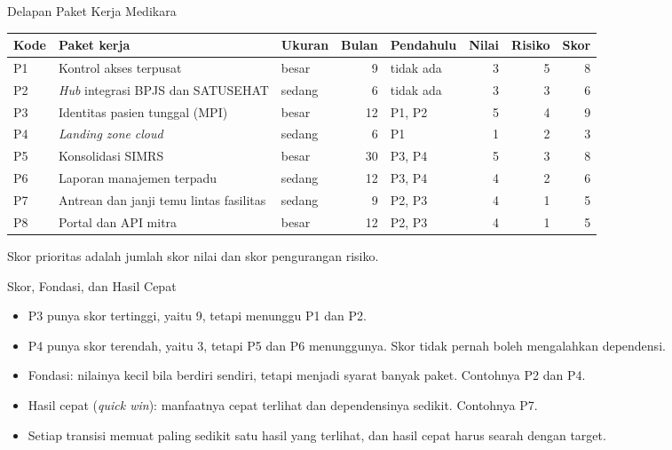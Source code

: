 \documentclass[aspectratio=169, table, 12pt]{beamer}
\begin{document}
\begin{frame}{{\Large Delapan Paket Kerja Medikara}}
  \scriptsize
  \begin{tabularx}{\textwidth}{lYlrlrrr}
    \hline
    \textbf{Kode} & \textbf{Paket kerja} & \textbf{Ukuran} & \textbf{Bulan} &
      \textbf{Pendahulu} & \textbf{Nilai} & \textbf{Risiko} & \textbf{Skor} \\
    \hline
    P1 & Kontrol akses terpusat & besar & 9 & tidak ada & 3 & 5 & 8 \\
    \hline
    P2 & \textit{Hub} integrasi BPJS dan SATUSEHAT & sedang & 6 & tidak ada & 3 & 3 & 6 \\
    \hline
    P3 & Identitas pasien tunggal (MPI) & besar & 12 & P1, P2 & 5 & 4 & 9 \\
    \hline
    P4 & \textit{Landing zone} \textit{cloud} & sedang & 6 & P1 & 1 & 2 & 3 \\
    \hline
    P5 & Konsolidasi SIMRS & besar & 30 & P3, P4 & 5 & 3 & 8 \\
    \hline
    P6 & Laporan manajemen terpadu & sedang & 12 & P3, P4 & 4 & 2 & 6 \\
    \hline
    P7 & Antrean dan janji temu lintas fasilitas & sedang & 9 & P2, P3 & 4 & 1 & 5 \\
    \hline
    P8 & Portal dan API mitra & besar & 12 & P2, P3 & 4 & 1 & 5 \\
    \hline
  \end{tabularx}

  \vspace{6pt}
  \small Skor prioritas adalah jumlah skor nilai dan skor pengurangan risiko.
\end{frame}

\begin{frame}{{\Large Skor, Fondasi, dan Hasil Cepat}}
  \small
  \vspace{4pt}
  \begin{itemize}
    \item P3 punya skor tertinggi, yaitu 9, tetapi menunggu P1 dan P2.
    \item P4 punya skor terendah, yaitu 3, tetapi P5 dan P6 menunggunya. Skor tidak pernah boleh
          mengalahkan dependensi.
    \item Fondasi: nilainya kecil bila berdiri sendiri, tetapi menjadi syarat banyak paket. Contohnya
          P2 dan P4.
    \item Hasil cepat (\textit{quick win}): manfaatnya cepat terlihat dan dependensinya sedikit.
          Contohnya P7.
    \item Setiap transisi memuat paling sedikit satu hasil yang terlihat, dan hasil cepat harus searah
          dengan target.
  \end{itemize}
\end{frame}
\end{document}
